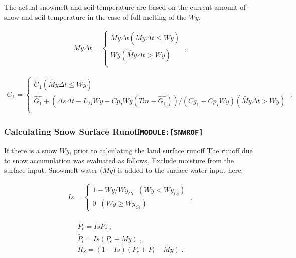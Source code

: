 The actual snowmelt and soil temperature are based on the current amount
of snow and soil temperature in the case of full melting of the \(Wy\),

\begin{eqnarray}
My \Delta t = \left\{
   \begin{array}{ll}
      \tilde{My} \Delta t  ( \tilde{My} \Delta t \le Wy ) \\
      Wy                   ( \tilde{My} \Delta t >   Wy ) \\
   \end{array}
\right. \; ,
\end{eqnarray}

\begin{eqnarray}
G_1 = \left\{
   \begin{array}{ll}
      \tilde{G_1}   ( \tilde{My} \Delta t \le Wy ) \\
      \hat{G_1} + ( \Delta s \Delta t - L_M Wy - Cp_I Wy ( Tm - \hat{G_1} ) )
                / ( Cg_1 - Cp_I Wy )
                    ( \tilde{My} \Delta t >   Wy ) \\
   \end{array}
\right. \; .
\end{eqnarray}

\hypertarget{calculating-snow-surface-runoffmodulesnwrof}{%
\subsubsection{\texorpdfstring{Calculating Snow Surface
Runoff\texttt{MODULE:{[}SNWROF{]}}}{Calculating Snow Surface RunoffMODULE:{[}SNWROF{]}}}\label{calculating-snow-surface-runoffmodulesnwrof}}

If there is a snow \(Wy\), prior to calculating the land surface runoff
The runoff due to snow accumulation was evaluated as follows, Exclude
moisture from the surface input. Snowmelt water (\(My\)) is added to the
surface water input here.

\begin{eqnarray}
  Is = \left\{
    \begin{array}{ll}
      1 - Wy / Wy_{Ci}  \;\; ( Wy < Wy_{Ci} ) \\
      0                 \;\; ( Wy \ge Wy_{Ci} )
    \end{array}
  \right. \; ,
\end{eqnarray}

\begin{eqnarray}
  \widetilde{P_c} = Is P_c \; ,\\
  \widetilde{P_l} = Is ( P_c + My ) \; ,\\
  R_S        = ( 1 - Is )( P_c + P_l + My ) \; .
\end{eqnarray}

